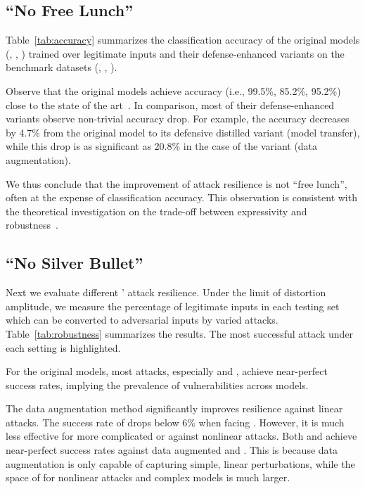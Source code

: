 \subsection{``No Free Lunch''}

Table~\ref{tab:accuracy} summarizes the classification accuracy of the original \dnn models (\cnn, \mxn, \nin) trained over legitimate inputs and their defense-enhanced variants on the benchmark datasets (\mnist, \cifar, \svhn).



 Observe that the original models achieve accuracy (i.e., 99.5\%, 85.2\%, 95.2\%) close to the state of the art~\cite{classification:result}. In comparison, most of their defense-enhanced variants observe non-trivial accuracy drop. For example, the accuracy decreases by 4.7\% from the original \mxn model to its defensive distilled variant (model transfer), while this drop is as significant as 20.8\% in the case of the \ttgt variant (data augmentation).

We thus conclude that the improvement of attack resilience is not ``free lunch'', often at the expense of classification accuracy. This observation is consistent with the theoretical investigation on the trade-off between \dnn expressivity and robustness~\cite{Fawzi:2015:arxiv}.

\subsection{``No Silver Bullet''}

Next we evaluate different \dnns' attack resilience. Under the limit of distortion amplitude, we measure the percentage of legitimate inputs in each testing set which can be converted to adversarial inputs by varied attacks. Table~\ref{tab:robustness} summarizes the results. The most successful attack under each setting is highlighted.

For the original models, most attacks, especially \ttp and \ttca, achieve near-perfect success rates, implying the prevalence of vulnerabilities across \dnn models.

The data augmentation method significantly improves \dnn resilience against linear attacks. The success rate of \ttga drops below  6\% when facing {\ttgt} \cnn.
However, it is much less effective for more complicated \dnns or against nonlinear attacks. Both \ttp and \ttca achieve near-perfect success rates against data augmented \mxn and \nin. This is because data augmentation is only capable of capturing simple, linear perturbations, while the space of \pvs for nonlinear attacks and complex \dnn models is much larger.

